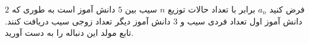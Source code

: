 \exercise
فرض کنید 
$a_n$
برابر با تعداد حالات توزیع 
$n$
 سیب بین 
$5$
  دانش آموز است به طوری که 
$2$
   دانش آموز اول تعداد فردی سیب و 
$3$
    دانش آموز دیگر تعداد زوجی سیب دریافت کنند. تابع مولد این دنباله را به دست آورید.